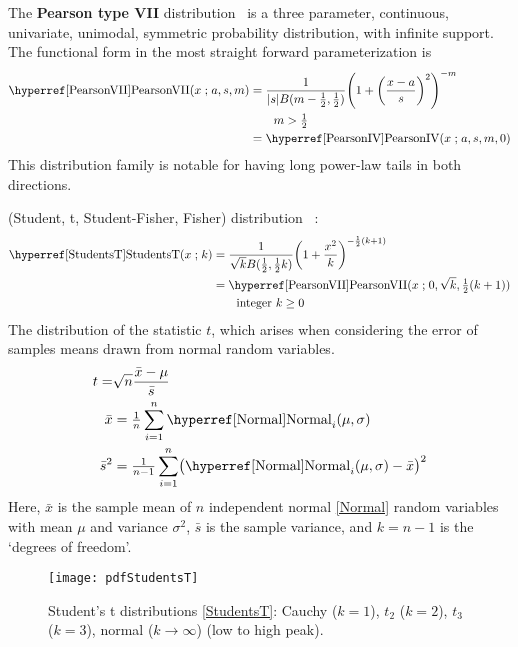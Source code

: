


The {\bf Pearson type VII} distribution~\cite{Pearson1916} is a three parameter, continuous, univariate, unimodal, symmetric probability distribution, with infinite support. The functional form in the most straight forward parameterization is
\begin{align}
\label{PearsonVII}
\opr{PearsonVII}(x\given a,s, m) 
&= \frac{1}{|s| B(m-\frac{1}{2}, \frac{1}{2} )} \Left( 1 +\Left( \frac{x-a}{s}\Right)^2 \Right)^{-m} 	\checked
\\ \notag
& \qquad m > \tfrac{1}{2}
\\ \notag & = \opr{PearsonIV}(x\given a,s, m,0)  \checked
\end{align}
This distribution family is notable for having long power-law tails in both directions. 




 (Student, t, Student-Fisher, Fisher) distribution~\cite{Student1908,Fisher1925b,Hanley2008,Zabell2008} :
\begin{align}
\label{StudentsT}
\opr{StudentsT}(x\given k) 
&= \frac{1}{\sqrt{k} B(\frac{1}{2}, \frac{1}{2} k)} \Left( 1 + \frac{x^2}{k} \Right)^{-\frac{1}{2}(k+1)} \checked
\\ &= \opr{PearsonVII}(x\given 0,\sqrt{k},\tfrac{1}{2}(k+1)) \checked
\notag
\\ & \qquad \text{integer } k \geq 0
\notag
\end{align}
The distribution of the statistic $t$, which arises when considering the error of samples means drawn from normal random variables.
\begin{align*}
	t =& \sqrt{n} \frac {\bar{x} - \mu}{\bar{s}}  \checked \\ 
	\bar{x} & = \tfrac{1}{n} \sum_{i=1}^{n} \opr{Normal}_i (\mu,\sigma)   \checked \\
	\bar{s}^2 &= \tfrac{1}{n-1} \sum_{i=1}^{n} \bigl( \opr{Normal}_i (\mu,\sigma) - \bar{x} \bigr)^2 \checked
\end{align*}
Here, $\bar{x}$ is the sample mean of $n$ independent normal \eqref{Normal} random variables with mean $\mu$ and variance  $\sigma^2$, $\bar{s}$ is the sample variance, and $k=n-1$ is the `degrees of freedom'.


\begin{figure}[t]
\begin{center}
\texttt{[image: pdfStudentsT]}
\end{center}
\caption[Student's t distributions]{Student's t distributions \eqref{StudentsT}: Cauchy ($k=1$), $t_2$ ($k=2$), $t_3$ ($k=3$), normal ($k\rightarrow\infty$) (low to high peak).}
\end{figure}

